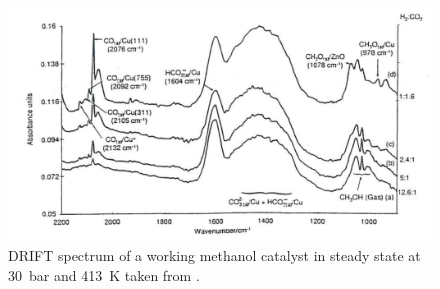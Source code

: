 \begin{figure}[h!]
	\begin{center}
	\includegraphics[scale=4]{figures/08_08.png}
	\caption{DRIFT spectrum of a working methanol catalyst  in steady state at \SI{30}{bar} and \SI{413}{K} taken from \cite{Bailey}.}
	\label{fig:driftspec}
	\end{center}
\end{figure}